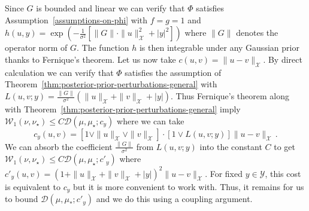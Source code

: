 \documentclass[final]{siamart171218}
\newcommand{\mcl}{\mathcal}
\newcommand{\mX}{\mcl{X}}
\newcommand{\mY}{\mcl{Y}}
\newcommand{\K}{\mathcal{D}}
\newcommand{\D}{\mathcal{D}}
\newcommand{\W}{\mathcal{W}}
\begin{document}
Since $G$ is bounded and linear we can verify that $\Phi$ 
satisfies Assumption~\ref{assumptions-on-phi} with  $f = g = 1$ and 
$h(u,y) = \exp( - \frac{1}{\sigma^2} \left[ \| G\| \cdot  \|u\|_{\mX}^2 + |y|^2 \right])$ where $\| G\|$ 
denotes the operator norm of $G$. 
The function $h$ is then integrable under any Gaussian prior thanks to Fernique's theorem. 
Let us now take $c(u,v) = \|u - v\|_\mX$. 
By direct calculation we can verify that $\Phi$ satisfies the 
assumption of Theorem~\ref{thm:posterior-prior-perturbations-general} 
with 
$L(u,v; y) = \frac{\| G\|}{\sigma^2}\left( \|u\|_\mX + \|v\|_\mX + |y| \right) $.
Thus Fernique's theorem along with  Theorem~\ref{thm:posterior-prior-perturbations-general} imply 
$\W_1(\nu, \nu_\star) \le C \D(\mu, \mu_\star; c_y)$ where we can take
\begin{equation*}
    c_y(u,v) =  [ 1 \vee \|u\|_\mX \vee \|v\|_\mX] 
    \cdot [ 1 \vee L(u,v;y)] \| u - v \|_\mX\,.  
\end{equation*}
We can absorb the coefficient $\frac{\| G \|}{\sigma^2}$ from $ L(u,v;y)$
into the constant $C$ to get $\W_1( \nu, \nu_\star) \le C \K (\mu, \mu_\star; c'_y)$ where $c'_y(u,v) = (1 +  \| u\|_\mX + \|v\|_\mX + | y| )^2 \| u-v \|_\mX$.  For fixed $y\in \mY$, this cost is equivalent 
to $c_y$ but it is more convenient to work with. Thus, it remains for us 
to bound $\K( \mu, \mu_\ast; c'_y)$ and we do this using a coupling argument. 
\end{document}
